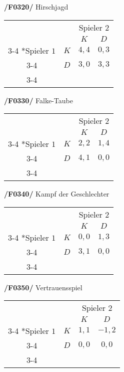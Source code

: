 \textbf{/F0320/} 
Hirschjagd
\begin{table}[H]
\centering
\setlength{\extrarowheight}{2pt}
\begin{tabular}{cc|c|c|}
  & \multicolumn{1}{c}{} & \multicolumn{2}{c}{Spieler $2$} \\
  & \multicolumn{1}{c}{} & \multicolumn{1}{c}{$K$} & \multicolumn{1}{c}{$D$} \\\cline{3-4}
  \multirow{2}*{Spieler $1$} & $K$ & $4,4$ & $0,3$ \\\cline{3-4} 
  & $D$ & $3,0$ & $3,3$ \\\cline{3-4}
\end{tabular}
\end{table}

\textbf{/F0330/} 
Falke-Taube
\begin{table}[H]
\centering
\setlength{\extrarowheight}{2pt}
\begin{tabular}{cc|c|c|}
  & \multicolumn{1}{c}{} & \multicolumn{2}{c}{Spieler $2$} \\
  & \multicolumn{1}{c}{} & \multicolumn{1}{c}{$K$} & \multicolumn{1}{c}{$D$} \\\cline{3-4}
  \multirow{2}*{Spieler $1$} & $K$ & $2,2$ & $1,4$ \\\cline{3-4} 
  & $D$ & $4,1$ & $0,0$ \\\cline{3-4}
\end{tabular}
\end{table}

\textbf{/F0340/} 
Kampf der Geschlechter
\begin{table}[H]
\centering
\setlength{\extrarowheight}{2pt}
\begin{tabular}{cc|c|c|}
  & \multicolumn{1}{c}{} & \multicolumn{2}{c}{Spieler $2$} \\
  & \multicolumn{1}{c}{} & \multicolumn{1}{c}{$K$} & \multicolumn{1}{c}{$D$} \\\cline{3-4}
  \multirow{2}*{Spieler $1$} & $K$ & $0,0$ & $1,3$ \\\cline{3-4} 
  & $D$ & $3,1$ & $0,0$ \\\cline{3-4}
\end{tabular}
\end{table}

\textbf{/F0350/} 
Vertrauensspiel
\begin{table}[H]
\centering
\setlength{\extrarowheight}{2pt}
\begin{tabular}{cc|c|c|}
  & \multicolumn{1}{c}{} & \multicolumn{2}{c}{Spieler $2$} \\
  & \multicolumn{1}{c}{} & \multicolumn{1}{c}{$K$} & \multicolumn{1}{c}{$D$} \\\cline{3-4}
  \multirow{2}*{Spieler $1$} & $K$ & $1,1$ & $-1,2$ \\\cline{3-4} 
  & $D$ & $0,0$ & $0,0$ \\\cline{3-4}
\end{tabular}
\end{table}

